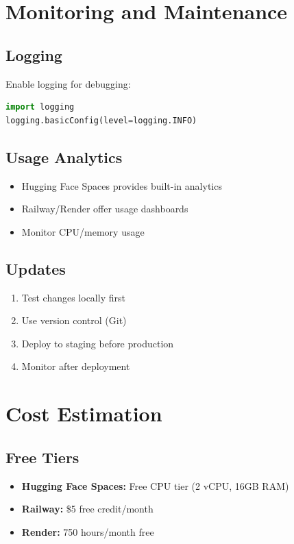 \documentclass[11pt,a4paper]{article}
\begin{document}
\section{Monitoring and Maintenance}

\subsection{Logging}
Enable logging for debugging:
\begin{lstlisting}[language=Python]
import logging
logging.basicConfig(level=logging.INFO)
\end{lstlisting}

\subsection{Usage Analytics}
\begin{itemize}
    \item Hugging Face Spaces provides built-in analytics
    \item Railway/Render offer usage dashboards
    \item Monitor CPU/memory usage
\end{itemize}

\subsection{Updates}
\begin{enumerate}
    \item Test changes locally first
    \item Use version control (Git)
    \item Deploy to staging before production
    \item Monitor after deployment
\end{enumerate}

\section{Cost Estimation}

\subsection{Free Tiers}
\begin{itemize}
    \item \textbf{Hugging Face Spaces:} Free CPU tier (2 vCPU, 16GB RAM)
    \item \textbf{Railway:} \$5 free credit/month
    \item \textbf{Render:} 750 hours/month free
\end{itemize}
\end{document}
